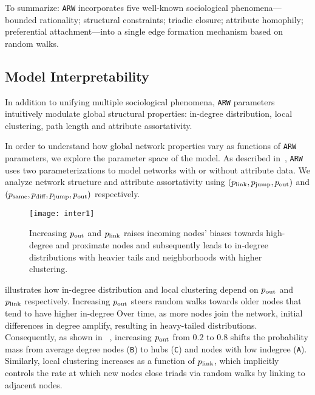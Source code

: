 To summarize: \texttt{ARW} incorporates five well-known sociological
phenomena--- bounded rationality; structural constraints; triadic closure;
attribute homophily; preferential attachment---into a single edge formation
mechanism based on random walks.


\subsection{Model Interpretability}
In addition to unifying multiple sociological phenomena, \texttt{ARW} parameters
intuitively modulate global structural properties:
in-degree distribution, local clustering, path length and attribute assortativity.

In order to understand how global network properties vary as functions of
\texttt{ARW} parameters, we explore the parameter space of the model. As
described in~, \texttt{ARW} uses two
parameterizations to model networks with or without attribute data. We analyze
network structure and attribute assortativity using $(p_{\scriptsize\mbox{link}}, p_{\scriptsize\mbox{jump}}, p_{\scriptsize\mbox{out}})$
and $(p_{\scriptsize\mbox{same}}, p_{\scriptsize\mbox{diff}}, p_{\scriptsize\mbox{jump}}, p_{\scriptsize\mbox{out}})$ respectively.

\begin{figure}[t]
 \centering
 \texttt{[image: inter1]}
 \caption{
 	Increasing $p_{\scriptsize\mbox{out}}$ and $p_{\scriptsize\mbox{link}}$
	raises incoming nodes' biases towards high-degree and proximate nodes
	and subsequently leads to in-degree distributions with heavier tails
	and neighborhoods with higher clustering.
 }
 \label{fig:inter1}
 \vspace{-10pt}
\end{figure}

 illustrates how in-degree distribution and local clustering depend on $p_{\scriptsize\mbox{out}}$ and $p_{\scriptsize\mbox{link}}$ respectively.
Increasing $p_{\scriptsize\mbox{out}}$ steers random walks towards older nodes that tend to have higher in-degree
Over time, as more nodes join the network, initial differences in degree amplify, resulting in heavy-tailed distributions.
Consequently, as shown in ~, increasing $p_{\scriptsize\mbox{out}}$ from $0.2$ to $0.8$ shifts the probability
mass from average degree nodes (\texttt{B}) to hubs (\texttt{C}) and nodes with low indegree (\texttt{A}).
Similarly, local clustering increases as a function of $p_{\scriptsize\mbox{link}}$, which implicitly
controls the rate at which new nodes close triads via random walks by linking to adjacent nodes.

